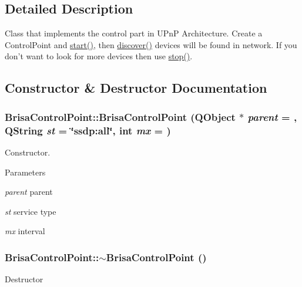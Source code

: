 \subsection{Detailed Description}
Class that implements the control part in UPnP Architecture. Create a ControlPoint and \hyperlink{classBrisaUpnp_1_1BrisaControlPoint_ab370001909d0f7b0ec059b693675d964}{start()}, then \hyperlink{classBrisaUpnp_1_1BrisaControlPoint_a369ace207c8aeb4256e10248c0c31c35}{discover()} devices will be found in network. If you don't want to look for more devices then use \hyperlink{classBrisaUpnp_1_1BrisaControlPoint_a39876b0ff6901907710cd6f7782c4f52}{stop()}. 

\subsection{Constructor \& Destructor Documentation}
\hypertarget{classBrisaUpnp_1_1BrisaControlPoint_a59c74d17b9fa93839e027bcc3affb54e}{
\subsubsection[{BrisaControlPoint}]{\setlength{\rightskip}{0pt plus 5cm}BrisaControlPoint::BrisaControlPoint (QObject $\ast$ {\em parent} = {}, \/  QString {\em st} = {\ttfamily \char`\"{}ssdp:all\char`\"{}}, \/  int {\em mx} = {})}}
\label{classBrisaUpnp_1_1BrisaControlPoint_a59c74d17b9fa93839e027bcc3affb54e}


Constructor. 
\begin{DoxyParams}{Parameters}
\item[{\em parent}]parent \item[{\em st}]service type \item[{\em mx}]interval \end{DoxyParams}
\hypertarget{classBrisaUpnp_1_1BrisaControlPoint_a5614755c2d4c0b3dc00c97e601d10e1a}{
\subsubsection[{$\sim$BrisaControlPoint}]{\setlength{\rightskip}{0pt plus 5cm}BrisaControlPoint::$\sim$BrisaControlPoint ()}}
\label{classBrisaUpnp_1_1BrisaControlPoint_a5614755c2d4c0b3dc00c97e601d10e1a}
Destructor 

